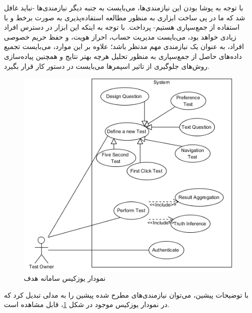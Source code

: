 با توجه به پوشا بودن این نیازمندی‌ها، می‌بایست به جنبه دیگر نیازمندی‌ها -نباید غافل شد که ما در پی ساخت ابزاری به منظور مطالعه استفاده‌پذیری به صورت برخط و با استفاده از جمع‌سپاری هستیم- پرداخت. با توجه به اینکه این ابزار در دسترس افراد زیادی خواهد بود، می‌بایست مدیریت حساب، احراز هویت، و حفظ حریم خصوصی افراد، به عنوان یک نیازمندی مهم مدنظر باشد؛ علاوه بر این موارد، می‌بایست تجمیع داده‌های حاصل از جمع‌سپاری به منظور تحلیل هرچه بهتر نتایج و همچنین پیاده‌سازی روش‌های جلوگیری از تاثیر اسپمرها می‌بایست در دستور کار قرار بگیرد.\\
\begin{figure}[H]
	\centering\includegraphics[width=\linewidth]{Resources/usecase_2.PNG}
	\caption[نمودار یوزکیس سامانه هدف]{
		نمودار یوزکیس سامانه هدف
	}
	\label{fig:usecase}
\end{figure}
با توضیحات پیشین، می‌توان نیازمندی‌های مطرح شده پیشین را به مدلی تبدیل کرد که در نمودار یوزکیس موجود در شکل
\ref{fig:usecase}،
قابل مشاهده است.
